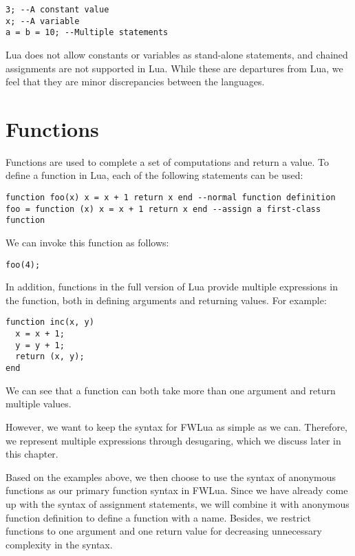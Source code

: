\begin{verbatim}
3; --A constant value
x; --A variable
a = b = 10; --Multiple statements
\end{verbatim}

Lua does not allow constants or variables as stand-alone statements, and chained assignments are not supported in Lua. While these are departures from Lua, we feel that they are minor discrepancies between the languages.

\section{Functions}
Functions are used to complete a set of computations and return a value. To define a function in Lua, each of the following statements can be used:

\begin{verbatim}
function foo(x) x = x + 1 return x end --normal function definition
foo = function (x) x = x + 1 return x end --assign a first-class function
\end{verbatim}

We can invoke this function as follows:

\begin{verbatim}
foo(4);
\end{verbatim}

In addition, functions in the full version of Lua provide multiple expressions in the function, both in defining arguments and returning values. For example:

\begin{verbatim}
function inc(x, y)
  x = x + 1;
  y = y + 1;
  return (x, y);
end
\end{verbatim}

We can see that a function can both take more than one argument and return multiple values.

However, we want to keep the syntax for FWLua as simple as we can. Therefore, we represent multiple expressions through desugaring, which we discuss later in this chapter.

Based on the examples above, we then choose to use the syntax of anonymous functions as our primary function syntax in FWLua. Since we have already come up with the syntax of assignment statements, we will combine it with anonymous function definition to define a function with a name. Besides, we restrict functions to one argument and one return value for decreasing unnecessary complexity in the syntax.

